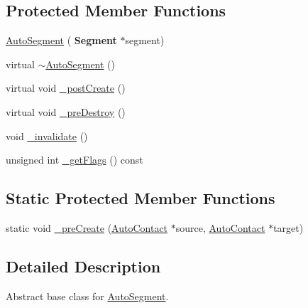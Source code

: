 \subsection*{Protected Member Functions}
\begin{DoxyCompactItemize}
\item 
\mbox{\hyperlink{classKatabatic_1_1AutoSegment_ae64a61508d148cb4a0ee9b5ffb177659}{Auto\+Segment}} (\textbf{ Segment} $\ast$segment)
\item 
virtual \mbox{\hyperlink{classKatabatic_1_1AutoSegment_a5d135025de0c1725d6252099c2e70e2b}{$\sim$\+Auto\+Segment}} ()
\item 
virtual void \mbox{\hyperlink{classKatabatic_1_1AutoSegment_a3715b38135ca24745f610bebd3407c10}{\+\_\+post\+Create}} ()
\item 
virtual void \mbox{\hyperlink{classKatabatic_1_1AutoSegment_a7c13d9795eafd477994961f8a0d962d0}{\+\_\+pre\+Destroy}} ()
\item 
void \mbox{\hyperlink{classKatabatic_1_1AutoSegment_a6a98d2e5839b880893703ad45db4e4c4}{\+\_\+invalidate}} ()
\item 
unsigned int \mbox{\hyperlink{classKatabatic_1_1AutoSegment_ae5b4a4f67d480cd5c9ce104e73e73da9}{\+\_\+get\+Flags}} () const
\end{DoxyCompactItemize}
\subsection*{Static Protected Member Functions}
\begin{DoxyCompactItemize}
\item 
static void \mbox{\hyperlink{classKatabatic_1_1AutoSegment_a8348937b1db79480305b178482d3ed61}{\+\_\+pre\+Create}} (\mbox{\hyperlink{classKatabatic_1_1AutoContact}{Auto\+Contact}} $\ast$source, \mbox{\hyperlink{classKatabatic_1_1AutoContact}{Auto\+Contact}} $\ast$target)
\end{DoxyCompactItemize}


\subsection{Detailed Description}
Abstract base class for \mbox{\hyperlink{classKatabatic_1_1AutoSegment}{Auto\+Segment}}. 

